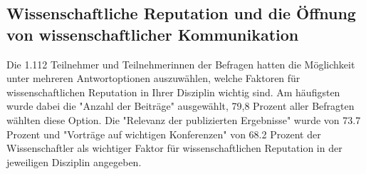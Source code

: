 \subsection{Wissenschaftliche Reputation und die Öffnung von wissenschaftlicher Kommunikation}

Die 1.112 Teilnehmer und Teilnehmerinnen der Befragen hatten die Möglichkeit unter mehreren Antwortoptionen auszuwählen, welche Faktoren für wissenschaftlichen Reputation in Ihrer Disziplin wichtig sind. Am häufigsten wurde dabei die "Anzahl der Beiträge" ausgewählt, 79,8 Prozent aller Befragten wählten diese Option. Die "Relevanz der publizierten Ergebnisse" wurde von 73.7 Prozent und "Vorträge auf wichtigen Konferenzen" von 68.2 Prozent der Wissenschaftler als wichtiger Faktor für wissenschaftlichen Reputation in der jeweiligen Disziplin angegeben.

